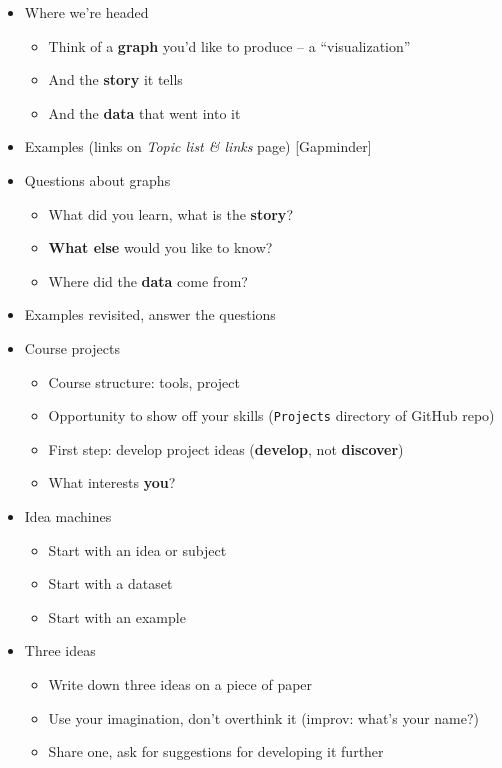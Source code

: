 \documentclass[11pt]{article}
\begin{document}
\begin{itemize}

\item Where we're headed
\begin{itemize} 
\item Think of a {\bf graph\/} you'd like to produce -- a ``visualization''
\item And the {\bf story\/} it tells 
\item And the {\bf data\/} that went into it 
\end{itemize} 

\item Examples (links on {\it Topic list \& links\/} page) [Gapminder]

\item Questions about graphs
\begin{itemize}
\item What did you learn, what is the {\bf story\/}?  
\item {\bf What else} would you like to know?
\item Where did the {\bf data\/} come from?
\end{itemize}

\item Examples revisited, answer the questions  

\item Course projects
\begin{itemize}
\item Course structure:  tools, project 
\item Opportunity to show off your skills ({\tt Projects} directory of GitHub repo) 
\item First step:  develop project ideas ({\bf develop}, not {\bf discover}) 
\item What interests {\bf you}?  
\end{itemize}

\item Idea machines
\begin{itemize}
\item Start with an idea or subject 
\item Start with a dataset
\item Start with an example 
\end{itemize}

\item Three ideas
\begin{itemize}
\item Write down three ideas on a piece of paper 
\item Use your imagination, don't overthink it (improv: what's your name?)  
\item Share one, ask for suggestions for developing it further 
\end{itemize}

\end{itemize}
\end{document}
